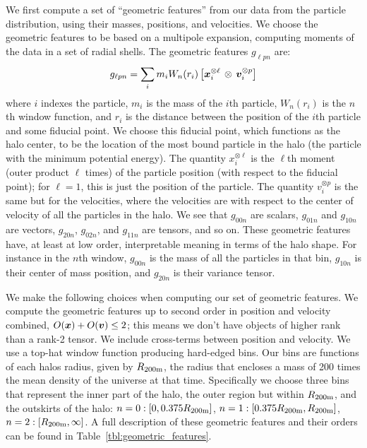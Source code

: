 We first compute a set of ``geometric features'' from our data from the particle distribution, using their masses, positions, and velocities. 
We choose the geometric features to be based on a multipole expansion, computing moments of the data in a set of radial shells. 
The geometric features $g_{\ell p n}$ are: 
\label{eq:geo}
\begin{equation}
    g_{\ell p n} = \sum_i m_i W_n(r_i)  \left[ \bm{x}_i^{\otimes \ell} \, \otimes \, \bm{v}_i^{\otimes p} \right]
\end{equation}
where $i$ indexes the particle, $m_i$ is the mass of the $i$th particle, $W_n(r_i)$ is the $n$th window function, and $r_i$ is the distance between the position of the $i$th particle and some fiducial point.
We choose this fiducial point, which functions as the halo center, to be the location of the most bound particle in the halo (the particle with the minimum potential energy).
The quantity $x_i^{\otimes \ell}$ is the $\ell$th moment (outer product $\ell$ times) of the particle position (with respect to the fiducial point); for $\ell = 1$, this is just the position of the particle.
The quantity $v_i^{\otimes p}$ is the same but for the velocities, where the velocities are with respect to the center of velocity of all the particles in the halo.
We see that $g_{00n}$ are scalars, $g_{01n}$ and $g_{10n}$ are vectors, $g_{20n}$, $g_{02n}$, and $g_{11n}$ are tensors, and so on.
These geometric features have, at least at low order, interpretable meaning in terms of the halo shape.
For instance in the $n$th window, $g_{00n}$ is the mass of all the particles in that bin, $g_{10n}$ is their center of mass position, and $g_{20n}$ is their variance tensor.

We make the following choices when computing our set of geometric features.
We compute the geometric features up to second order in position and velocity combined, $O(\bm{x}) + O(\bm{v}) \leq 2$; this means we don't have objects of higher rank than a rank-2 tensor. 
We include cross-terms between position and velocity.
We use a top-hat window function producing hard-edged bins. 
Our bins are functions of each halos radius, given by $R_\mathrm{200m}$, the radius that encloses a mass of 200 times the mean density of the universe at that time.
Specifically we choose three bins that represent the inner part of the halo, the outer region but within $R_\mathrm{200m}$, and the outskirts of the halo: $n=0: [0, 0.375R_\mathrm{200m}]$, $n=1: [0.375R_\mathrm{200m}, R_\mathrm{200m}]$, $n=2: [R_\mathrm{200m}, \infty]$.
A full description of these geometric features and their orders can be found in Table~\ref{tbl:geometric_features}.

